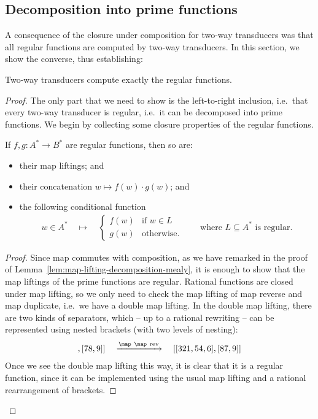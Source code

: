 \subsection{Decomposition into prime functions}
\label{sec:decomposition-2dfa-into-primes}

A consequence of the closure under composition for two-way transducers was that all regular functions are computed by two-way transducers. In this section, we show the converse, thus establishing:
\begin{theorem}
    \label{thm:2dfa-decomposition-into-primes}
    Two-way transducers compute exactly the regular functions. 
\end{theorem}
\begin{proof}
    The only part that we need to show is the left-to-right inclusion, i.e.~that every two-way transducer is regular, i.e.~it can be decomposed into prime functions. We begin by collecting some closure properties of the regular functions.
    \begin{lemma}
        \label{lem:regular-closure-properties}
        If $f,g : A^* \to B^*$ are regular functions, then so are: 
        \begin{itemize}
            \item their map liftings; and
            \item their concatenation $w \mapsto f(w)\cdot g(w)$; and
            \item the following conditional function
            \begin{align*}
            w \in A^* \quad \mapsto \quad
            \begin{cases}
                f(w) & \text{if $w \in L$}\\
                g(w) & \text{otherwise.}
            \end{cases}
            \qquad \text{where $L \subseteq A^*$ is regular.}
            \end{align*}
        \end{itemize}
    \end{lemma}
    \begin{proof}
        Since map commutes with composition, as we have remarked in the proof of Lemma~\ref{lem:map-lifting-decomposition-mealy}, it is enough to show that the map liftings of the prime functions are regular. Rational functions are closed under map lifting, so we only need to check the map lifting of map reverse and map duplicate, i.e.~we have a double map lifting. In the double map lifting, there are two kinds of separators, which -- up to a rational rewriting -- can be represented using nested brackets (with two levels of nesting): 
        \begin{align*}
        [[123,45,6],[78,9]] \quad \xrightarrow{\map\  \map\  \text{rev}} \quad [[321,54,6],[87,9]]
        \end{align*}
        Once we see the double map lifting this way, it is clear that it is a regular function, since it can be implemented using the usual map lifting and a rational rearrangement of brackets.


\end{proof}
\end{proof}
